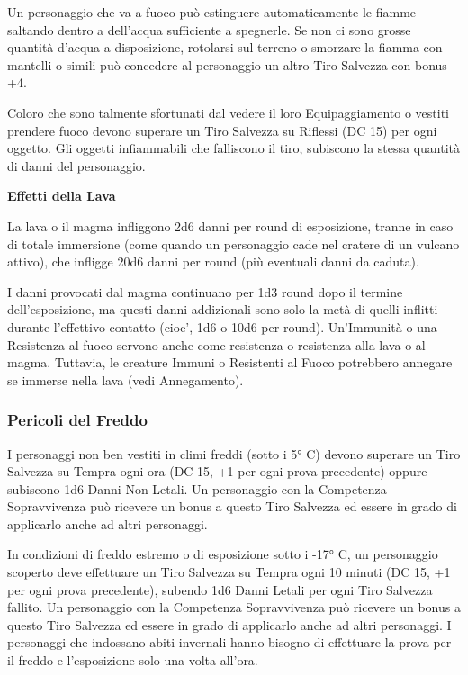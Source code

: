\documentclass[a4paper,11pt,twoside,openany]{book}
\begin{document}
{Un personaggio che va a fuoco può estinguere automaticamente le fiamme saltando dentro a dell'acqua sufficiente a spegnerle. Se non ci sono grosse quantità d'acqua a disposizione, rotolarsi sul terreno o smorzare la fiamma con mantelli o simili può concedere al personaggio un altro Tiro Salvezza con bonus +4.

Coloro che sono talmente sfortunati dal vedere il loro Equipaggiamento o vestiti prendere fuoco devono superare un Tiro Salvezza su Riflessi (DC 15) per ogni oggetto. Gli oggetti infiammabili che falliscono il tiro, subiscono la stessa quantità di danni del personaggio.

\medskip

\textbf{Effetti della Lava}

La lava o il magma infliggono 2d6 danni per round di esposizione, tranne in caso di totale immersione (come quando un personaggio cade nel cratere di un vulcano attivo), che infligge 20d6 danni per round (più eventuali danni da caduta).

I danni provocati dal magma continuano per 1d3 round dopo il termine dell'esposizione, ma questi danni addizionali sono solo la metà di quelli inflitti durante l'effettivo contatto (cioe', 1d6 o 10d6 per round). Un'Immunità o una Resistenza al fuoco servono anche come resistenza o resistenza alla lava o al magma. Tuttavia, le creature Immuni o Resistenti al Fuoco potrebbero annegare se immerse nella lava (vedi Annegamento).


\subsubsection{Pericoli del Freddo}

\label{pericoli-del-freddo}

I personaggi non ben vestiti in climi freddi (sotto i 5° C) devono superare un Tiro Salvezza su Tempra ogni ora (DC 15, +1 per ogni prova precedente) oppure subiscono 1d6 Danni Non Letali. Un personaggio con la Competenza Sopravvivenza può ricevere un bonus a questo Tiro Salvezza ed essere in grado di applicarlo anche ad altri personaggi.

In condizioni di freddo estremo o di esposizione sotto i -17° C, un personaggio scoperto deve effettuare un Tiro Salvezza su Tempra ogni 10 minuti (DC 15, +1 per ogni prova precedente), subendo 1d6 Danni Letali per ogni Tiro Salvezza fallito. Un personaggio con la Competenza Sopravvivenza può ricevere un bonus a questo Tiro Salvezza ed essere in grado di applicarlo anche ad altri personaggi. I personaggi che indossano abiti invernali hanno bisogno di effettuare la prova per il freddo e l'esposizione solo una volta all'ora.

}
\end{document}
